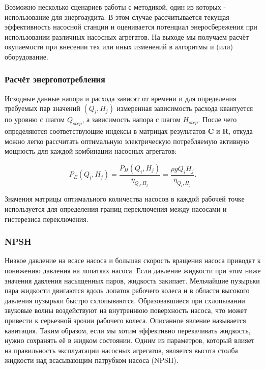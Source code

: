 \documentclass[a4paper, 12pt]{article}
\begin{document}
Возможно несколько сценариев работы с методикой, один из которых - использование для энергоаудита.
В этом случае рассчитывается текущая эффективность насосной станции и оценивается потенциал энеросбережения
при использовании различных насосных агрегатов. На выходе мы получаем расчёт окупаемости при внесении тех или иных изменений в алгоритмы и (или) оборудование.

\subsubsection{Расчёт энергопотребления}

    Исходные данные напора и расхода зависят от времени и для определения
требуемых пар значений \((Q_i, H_j)\) измеренная зависимость расхода
квантуется по уровню с шагом \(Q_{step}\), а зависимость напора с шагом
\(H_{step}\). После чего определяются соответствующие индексы в матрицах
результатов \(\mathbf{C}\) и \(\mathbf{R}\), откуда можно легко
рассчитать оптимальную электрическую потребляемую активную мощность для
каждой комбинации насосных агрегатов:

\begin{equation}
	P_E(Q_i, H_j) = \frac{P_H(Q_i, H_j)}{\eta_{Q_i, H_j}} = \frac{\rho gQ_iH_j}{\eta_{Q_i, H_j}}.
\end{equation}

\noindent Значения матрицы оптимального количества насосов в каждой рабочей точке
используется для определения границ переключения между насосами и
гистерезиса переключения.


\subsubsection{NPSH}

Низкое давление на всасе насоса и большая скорость вращения насоса приводят к понижению давления на лопатках насоса. Если давление жидкости при этом ниже значения давления насыщенных паров, жидкость закипает. Мельчайшие пузырьки пара жидкости двигаются вдоль лопаток рабочего колеса и в области высокого давления пузырьки быстро схлопываются. Образовавшиеся при схлопывании звуковые волны воздействуют на внутреннюю поверхность насоса, что может привести к серьезной эрозии рабочего колеса. Описанное явление называется кавитация. Таким образом, если мы хотим эффективно перекачивать жидкость, нужно сохранять её в жидком состоянии. Одним из параметров, который влияет на правильность эксплуатации насосных агрегатов, является высота столба жидкости над всасывающим патрубком насоса (NPSH).
\end{document}
